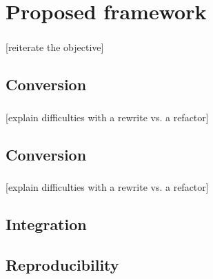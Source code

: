 \documentclass{beamer}
\begin{document}
\section{Proposed framework}
\begin{frame}\frametitle{\secname}
	[reiterate the objective]
\end{frame}

\subsection{Conversion}
\begin{frame}\frametitle{\subsecname}
	[explain difficulties with a rewrite vs. a refactor]
\end{frame}

\subsection{Conversion}
\begin{frame}\frametitle{\subsecname}
	[explain difficulties with a rewrite vs. a refactor]
\end{frame}

\subsection{Integration}
\begin{frame}\frametitle{\subsecname}
\end{frame}

\subsection{Reproducibility}
\begin{frame}\frametitle{\subsecname}
\end{frame}
\end{document}
